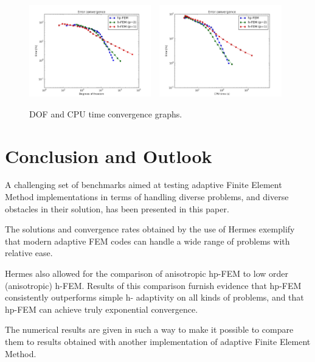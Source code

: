 \documentclass[12pt]{elsarticle}
\begin{document}
\begin{figure}[H]
\centering
\includegraphics[height=4cm]{nist/nist-12/conv_dof_aniso.png}\ \
\includegraphics[height=4cm]{nist/nist-12/conv_cpu_aniso.png}
\caption{DOF and CPU time convergence graphs.}
\label{fig:nist-12-conv}
\end{figure}


\section{Conclusion and Outlook}
\label{sec:conclusion}

A challenging set of benchmarks aimed at testing adaptive Finite Element Method implementations in terms of handling diverse problems, and diverse obstacles in their solution, has been presented in this paper.

The solutions and convergence rates obtained by the use of Hermes exemplify that modern adaptive FEM codes can handle a wide range of problems with relative ease.

Hermes also allowed for the comparison of anisotropic hp-FEM to low order (anisotropic) h-FEM. Results of this comparison furnish evidence that hp-FEM consistently outperforms simple h- adaptivity on all kinds of problems, and that hp-FEM can achieve truly exponential convergence.

The numerical results are given in such a way to make it possible to compare them to results obtained with another implementation of adaptive Finite Element Method.
\end{document}
